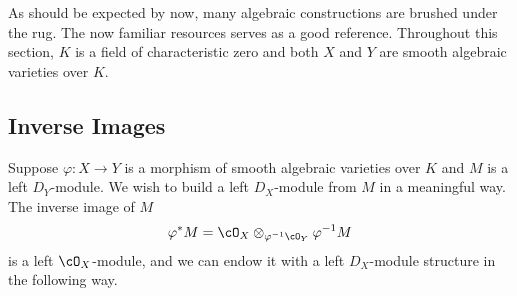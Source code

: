 As should be expected by now, many algebraic constructions are brushed under the rug. The now familiar resources \cite{ginzburg_d-mod} serves as a good reference. Throughout this section, $K$ is a field of characteristic zero and both $X$ and $Y$ are smooth algebraic varieties over $K$.

\subsection{Inverse Images}
Suppose $\varphi:X\to Y$ is a morphism of smooth algebraic varieties over $K$ and $M$ is a left $D_Y$-module. We wish to build a left $D_X$-module from $M$ in a meaningful way. The inverse image of $M$
\begin{align*}
	\varphi^*M = \cO_X \otimes_{\varphi^{-1}\cO_Y} \varphi^{-1}M
\end{align*}
is a left $\cO_X$-module, and we can endow it with a left $D_X$-module structure in the following way.

